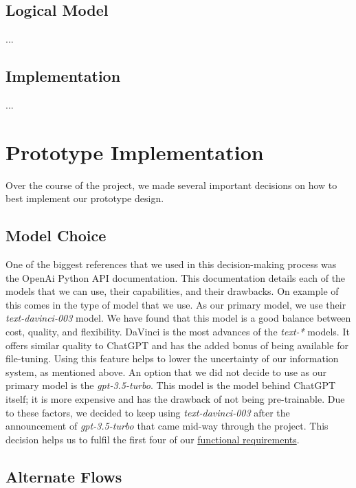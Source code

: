 \documentclass[12pt,a4paper]{article}
\begin{document}
    \subsection{Logical Model}
    ...

    \subsection{Implementation}
    ...

    \section{Prototype Implementation}

    Over the course of the project, we made several important decisions on how to best implement our
    prototype design.

    \subsection{Model Choice}

    One of the biggest references that we used in this decision-making process was
    the OpenAi Python API documentation\cite{openAiDocs}.  This documentation details
    each of the models that we can use, their capabilities, and their drawbacks.  On example of this
    comes in the type of model that we use.  As our primary model, we use their \textit{text-davinci-003}
    model.  We have found that this model is a good balance between cost, quality, and flexibility.
    DaVinci is the most advances of the \textit{text-*} models.  It offers similar quality to ChatGPT
    and has the added bonus of being available for file-tuning.  Using this feature helps to lower
    the uncertainty of our information system, as mentioned above.  An option that we did not decide to
    use as our primary model is the \textit{gpt-3.5-turbo}.  This model is the model behind ChatGPT itself;
    it is more expensive and has the drawback of not being pre-trainable.  Due to these factors, we
    decided to keep using \textit{text-davinci-003} after the announcement of \textit{gpt-3.5-turbo}
    that came mid-way through the project.  This decision helps us to fulfil the first four of our
    \hyperref[functionalReqs]{functional requirements}.

    \subsection{Alternate Flows}
\end{document}
